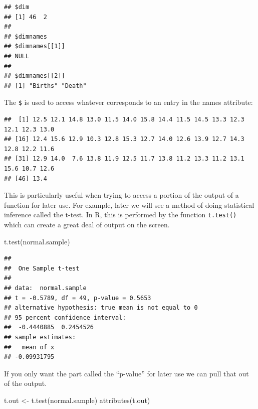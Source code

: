 \documentclass[
]{book}
\newenvironment{Shaded}{\begin{snugshade}}{\end{snugshade}}
\newcommand{\FunctionTok}[1]{\textcolor[rgb]{0.00,0.00,0.00}{#1}}
\newcommand{\NormalTok}[1]{#1}
\newcommand{\OtherTok}[1]{\textcolor[rgb]{0.56,0.35,0.01}{#1}}
\newcommand{\SpecialCharTok}[1]{\textcolor[rgb]{0.00,0.00,0.00}{#1}}
\begin{document}
\begin{verbatim}
## $dim
## [1] 46  2
## 
## $dimnames
## $dimnames[[1]]
## NULL
## 
## $dimnames[[2]]
## [1] "Births" "Death"
\end{verbatim}

The \texttt{\$} is used to access whatever corresponds to an entry in the names attribute:

\begin{Shaded}
\end{Shaded}

\begin{verbatim}
##  [1] 12.5 12.1 14.8 13.0 11.5 14.0 15.8 14.4 11.5 14.5 13.3 12.3 12.1 12.3 13.0
## [16] 12.4 15.6 12.9 10.3 12.8 15.3 12.7 14.0 12.6 13.9 12.7 14.3 12.8 12.2 11.6
## [31] 12.9 14.0  7.6 13.8 11.9 12.5 11.7 13.8 11.2 13.3 11.2 13.1 15.6 10.7 12.6
## [46] 13.4
\end{verbatim}

This is particularly useful when trying to access a portion of the output of a function for later use. For example, later we will see a method of doing statistical inference called the t-test. In R, this is performed by the function \texttt{t.test()} which can create a great deal of output on the screen.

\begin{Shaded}
\begin{Highlighting}[]
\FunctionTok{t.test}\NormalTok{(normal.sample)}
\end{Highlighting}
\end{Shaded}

\begin{verbatim}
## 
##  One Sample t-test
## 
## data:  normal.sample
## t = -0.5789, df = 49, p-value = 0.5653
## alternative hypothesis: true mean is not equal to 0
## 95 percent confidence interval:
##  -0.4440885  0.2454526
## sample estimates:
##   mean of x 
## -0.09931795
\end{verbatim}

If you only want the part called the ``p-value'' for later use we can pull that out of the output.

\begin{Shaded}
\begin{Highlighting}[]
\NormalTok{t.out }\OtherTok{\textless{}{-}} \FunctionTok{t.test}\NormalTok{(normal.sample)}
\FunctionTok{attributes}\NormalTok{(t.out)}
\end{Highlighting}
\end{Shaded}
\end{document}
